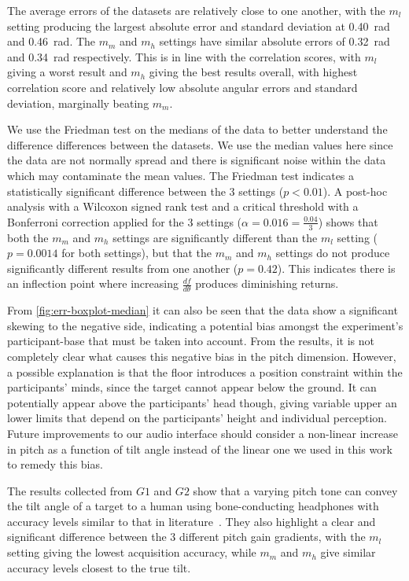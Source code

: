 \documentclass[sigconf, screen=true, anonymous=true]{acmart}
\begin{document}
The average errors of the datasets are relatively close to one another, with the $m_l$ setting producing the largest absolute error and standard deviation at \SI{0.40}{\radian} and \SI{0.46}{\radian}.
The $m_m$ and $m_h$ settings have similar absolute errors of \SI{0.32}{\radian} and \SI{0.34}{\radian} respectively.
This is in line with the correlation scores, with $m_l$ giving a worst result and $m_h$ giving the best results overall, with highest correlation score and relatively low absolute angular errors and standard deviation, marginally beating $m_m$. 

We use the Friedman test on the medians of the data to better understand the difference differences between the datasets.
We use the median values here since the data are not normally spread and there is significant noise within the data which may contaminate the mean values.
The Friedman test indicates a statistically significant difference between the 3 settings ($p < 0.01$).
A post-hoc analysis with a Wilcoxon signed rank test and a critical threshold with a Bonferroni correction applied for the 3 settings ($\alpha=0.016=\frac{0.04}{3}$) shows that both the $m_m$ and $m_h$ settings are significantly different than the $m_l$ setting ($p=0.0014$ for both settings), but that the $m_m$ and $m_h$ settings do not produce significantly different results from one another ($p=0.42$).
This indicates there is an inflection point where increasing $\frac{df}{d\theta}$ produces diminishing returns.

From \cref{fig:err-boxplot-median} it can also be seen that the data show a significant skewing to the negative side, indicating a potential bias amongst the experiment's participant-base that must be taken into account.
From the results, it is not completely clear what causes this negative bias in the pitch dimension.
However, a possible explanation is that the floor introduces a position constraint within the participants' minds, since the target cannot appear below the ground.
It can potentially appear above the participants' head though, giving variable upper an lower limits that depend on the participants' height and individual perception.
Future improvements to our audio interface should consider a non-linear increase in pitch as a function of tilt angle instead of the linear one we used in this work to remedy this bias.

The results collected from $G1$ and $G2$ show that a varying pitch tone can convey the tilt angle of a target to a human using bone-conducting headphones with accuracy levels similar to that in literature~\cite{bujacz2011sonification, katz2011spatial, zotkin2004rendering}.
They also highlight a clear and significant difference between the 3 different pitch gain gradients, with the $m_l$ setting giving the lowest acquisition accuracy, while $m_m$ and $m_h$ give similar accuracy levels closest to the true tilt. 
\end{document}

